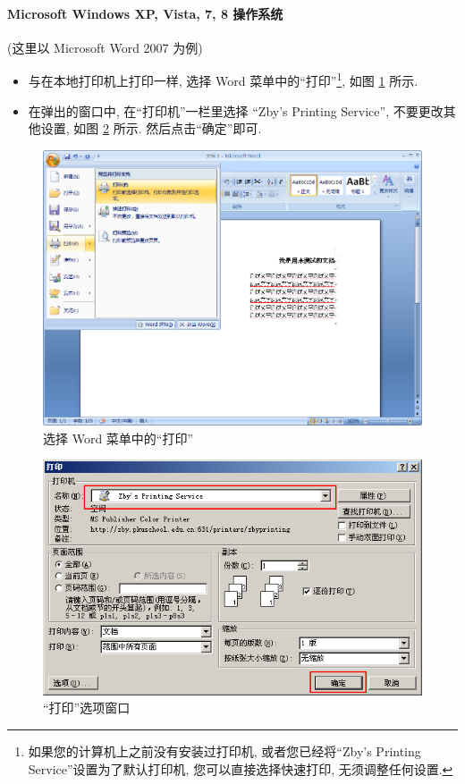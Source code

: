 \documentclass{article}
\begin{document}
\begin{CJK}{UTF8}{gbsn}
			\paragraph{Microsoft Windows XP, Vista, 7, 8 操作系统}
				(这里以 Microsoft Word 2007 为例)
				\begin{itemize}
					\item{与在本地打印机上打印一样, 选择 Word 菜单中的``打印''\footnote{如果您的计算机上之前没有安装过打印机, 或者您已经将``Zby's Printing Service''设置为了默认打印机, 您可以直接选择快速打印, 无须调整任何设置.}, 如图 \ref{fig:word_win} 所示.}
					\item{在弹出的窗口中, 在``打印机''一栏里选择 ``Zby's Printing Service'', 不要更改其他设置, 如图 \ref{fig:print_win} 所示. 然后点击``确定''即可.}
				\end{itemize}
				
				\begin{figure}[hp]
					\centering
					\includegraphics[height=0.45\textheight]{word_win.png}
					\caption{选择 Word 菜单中的``打印''}
					\label{fig:word_win}
				\end{figure}
				\begin{figure}[hp]
					\centering
					\includegraphics[height=0.45\textheight]{print_win.png}
					\caption{``打印''选项窗口}
					\label{fig:print_win}
				\end{figure}
				\clearpage
				

\end{CJK}
\end{document}
